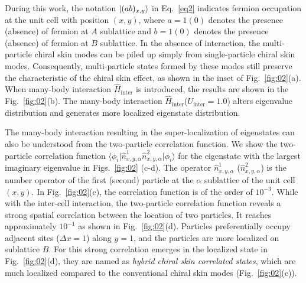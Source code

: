 \documentclass[longbibliography, aps, prx, amsmath, amssymb, amsfonts, twocolumn,superscriptaddress, footinbib]{revtex4-1}
\begin{document}
	During this work, the notation $\ket{(ab)_{x,y}}$ in Eq.~\ref{eq2} indicates fermion occupation at the unit cell with position $(x,y)$, where $a=1(0)$ denotes the presence (absence) of fermion at $A$ sublattice and $b=1(0)$ denotes the presence (absence) of fermion at $B$ sublattice.
	In the absence of interaction, the multi-particle chiral skin modes can be piled up simply from single-particle chiral skin modes. Consequently, multi-particle states formed by these modes still preserve the characteristic of the chiral skin effect, as shown in the inset of Fig.~\ref{fig:02}(a).
	When many-body interaction $\hat{H}_{\text{inter}}$ is introduced, the results are shown in the Fig.~\ref{fig:02}(b). The many-body interaction $\hat{H}_{\text{inter}}$($U_{\text{inter}}=1.0$) alters eigenvalue distribution and generates more localized eigenstate distribution. 

	The many-body interaction resulting in the super-localization of eigenstates can also be understood from the two-particle correlation function. 
	We show the two-particle correlation function $\langle \phi_i \vert \hat{n}^1_{x,y,\alpha} \hat{n}^2_{x,y,\alpha} \vert \phi_i \rangle$ for the eigenstate with the largest imaginary eigenvalue in Figs.~\ref{fig:02} (c-d). The operator $\hat{n}^1_{x,y,\alpha}$ ($\hat{n}^2_{x,y,\alpha}$) is the number operator of the first (second) particle at the $\alpha$ sublattice of the unit cell $(x,y)$.
	In Fig.~\ref{fig:02}(c), the correlation function is of the order of $10^{-3}$. While with the inter-cell interaction, the two-particle correlation function reveals a strong spatial correlation between the location of two particles. It reaches approximately $10^{-1}$ as shown in Fig.~\ref{fig:02}(d).
	Particles preferentially occupy adjacent sites ($\Delta x =1$) along $y=1$, and the particles are more localized on sublattice $B$. 
	For this strong correlation emerges in the localized state in Fig.~\ref{fig:02}(d), they are named as \textit{hybrid chiral skin correlated states}, which are much localized compared to the conventional chiral skin modes (Fig.~\ref{fig:02}(c)).
	
\end{document}
